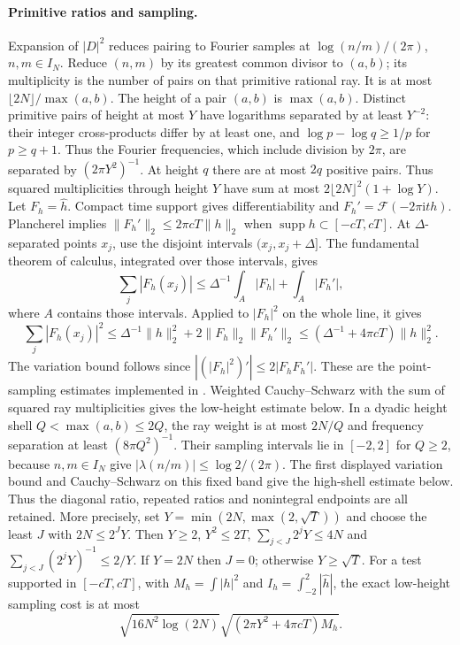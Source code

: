 \documentclass[11pt,a4paper,oneside]{article}
\theoremstyle{definition}
\newcommand{\ii}{\mathrm i}
\newcommand{\supp}{\operatorname{supp}}
\numberwithin{equation}{section}
\begin{document}
\paragraph{Primitive ratios and sampling.}
Expansion of $|D|^2$ reduces pairing to Fourier samples at
$\log(n/m)/(2\pi)$, $n,m\in I_N$. Reduce $(n,m)$ by its greatest common
divisor to $(a,b)$; its multiplicity is the number of pairs on that
primitive rational ray. It is at most $\lfloor2N\rfloor/\max(a,b)$.
The height of a pair $(a,b)$ is $\max(a,b)$. Distinct primitive pairs of height at most $Y$ have logarithms separated
by at least $Y^{-2}$: their integer cross-products differ by at least one,
and $\log p-\log q\ge1/p$ for $p\ge q+1$. Thus the Fourier frequencies, which include division by $2\pi$, are separated by $(2\pi Y^2)^{-1}$.
At height $q$ there are at most $2q$ positive pairs. Thus squared
multiplicities through height $Y$ have sum at most
$2\lfloor2N\rfloor^2(1+\log Y)$.
Let $F_h=\widehat h$. Compact time support gives differentiability and $F_h'=\mathcal F(-2\pi\ii t h)$. Plancherel implies $\|F_h'\|_2\le2\pi cT\|h\|_2$ when $\supp h\subset[-cT,cT]$. At $\Delta$-separated points $x_j$, use the disjoint intervals $(x_j,x_j+\Delta]$. The fundamental theorem of calculus, integrated over those intervals, gives
\[
 \sum_j|F_h(x_j)|\le\Delta^{-1}\int_A|F_h|+\int_A|F_h'|,
\]
where $A$ contains those intervals. Applied to $|F_h|^2$ on the whole line, it gives
\[
 \sum_j|F_h(x_j)|^2
 \le\Delta^{-1}\|h\|_2^2+2\|F_h\|_2\|F_h'\|_2
 \le(\Delta^{-1}+4\pi cT)\|h\|_2^2.
\]
The variation bound follows since $|(|F_h|^2)'|\le2|F_hF_h'|$. These are the point-sampling estimates implemented in \cite{Lewko}. Weighted Cauchy--Schwarz with the sum of squared ray multiplicities gives the low-height estimate below. In a dyadic height shell $Q<\max(a,b)\le2Q$, the ray weight is at most $2N/Q$ and frequency separation at least $(8\pi Q^2)^{-1}$. Their sampling intervals lie in $[-2,2]$ for $Q\ge2$, because $n,m\in I_N$ give $|\lambda(n/m)|\le\log2/(2\pi)$. The first displayed variation bound and Cauchy--Schwarz on this fixed band give the high-shell estimate below. Thus the diagonal ratio, repeated ratios and nonintegral endpoints are all retained.
More precisely, set $Y=\min(2N,\max(2,\sqrt T))$ and choose the least $J$
with $2N\le2^JY$. Then $Y\ge2$, $Y^2\le2T$,
$\sum_{j<J}2^jY\le4N$ and $\sum_{j<J}(2^jY)^{-1}\le2/Y$.
If $Y=2N$ then $J=0$; otherwise $Y\ge\sqrt T$.
For a test supported in $[-cT,cT]$, with
$M_h=\int|h|^2$ and $I_h=\int_{-2}^2|\widehat h|$, the exact low-height
sampling cost is at most
\[
 \sqrt{16N^2\log(2N)}\sqrt{(2\pi Y^2+4\pi cT)M_h}.
\]
\end{document}

